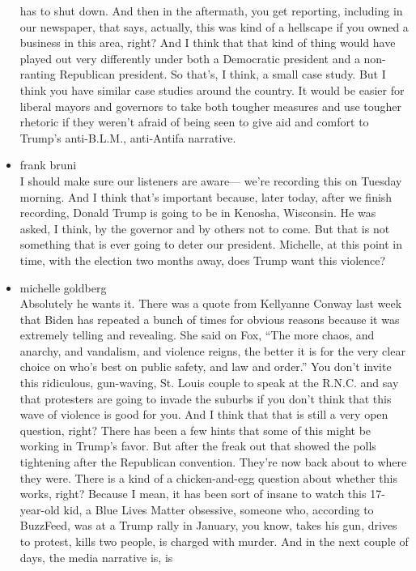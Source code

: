 \begin{itemize}
  has to shut down. And then in the aftermath, you get reporting,
  including in our newspaper, that says, actually, this was kind of a
  hellscape if you owned a business in this area, right? And I think
  that that kind of thing would have played out very differently under
  both a Democratic president and a non-ranting Republican president. So
  that's, I think, a small case study. But I think you have similar case
  studies around the country. It would be easier for liberal mayors and
  governors to take both tougher measures and use tougher rhetoric if
  they weren't afraid of being seen to give aid and comfort to Trump's
  anti-B.L.M., anti-Antifa narrative.
\item
  frank bruni\\
  I should make sure our listeners are aware--- we're recording this on
  Tuesday morning. And I think that's important because, later today,
  after we finish recording, Donald Trump is going to be in Kenosha,
  Wisconsin. He was asked, I think, by the governor and by others not to
  come. But that is not something that is ever going to deter our
  president. Michelle, at this point in time, with the election two
  months away, does Trump want this violence?
\item
  michelle goldberg\\
  Absolutely he wants it. There was a quote from Kellyanne Conway last
  week that Biden has repeated a bunch of times for obvious reasons
  because it was extremely telling and revealing. She said on Fox, ``The
  more chaos, and anarchy, and vandalism, and violence reigns, the
  better it is for the very clear choice on who's best on public safety,
  and law and order.'' You don't invite this ridiculous, gun-waving, St.
  Louis couple to speak at the R.N.C. and say that protesters are going
  to invade the suburbs if you don't think that this wave of violence is
  good for you. And I think that that is still a very open question,
  right? There has been a few hints that some of this might be working
  in Trump's favor. But after the freak out that showed the polls
  tightening after the Republican convention. They're now back about to
  where they were. There is a kind of a chicken-and-egg question about
  whether this works, right? Because I mean, it has been sort of insane
  to watch this 17-year-old kid, a Blue Lives Matter obsessive, someone
  who, according to BuzzFeed, was at a Trump rally in January, you know,
  takes his gun, drives to protest, kills two people, is charged with
  murder. And in the next couple of days, the media narrative is, is

\end{itemize}
